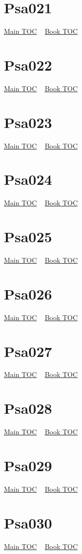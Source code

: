 \documentclass{book}
\begin{document}
  \section{Psa021}\hyperlink{toc}{Main TOC} ~ \hyperref[subsec:Psa]{Book TOC} 
  \section{Psa022}\hyperlink{toc}{Main TOC} ~ \hyperref[subsec:Psa]{Book TOC} 
  \section{Psa023}\hyperlink{toc}{Main TOC} ~ \hyperref[subsec:Psa]{Book TOC} 
  \section{Psa024}\hyperlink{toc}{Main TOC} ~ \hyperref[subsec:Psa]{Book TOC} 
  \section{Psa025}\hyperlink{toc}{Main TOC} ~ \hyperref[subsec:Psa]{Book TOC} 
  \section{Psa026}\hyperlink{toc}{Main TOC} ~ \hyperref[subsec:Psa]{Book TOC} 
  \section{Psa027}\hyperlink{toc}{Main TOC} ~ \hyperref[subsec:Psa]{Book TOC} 
  \section{Psa028}\hyperlink{toc}{Main TOC} ~ \hyperref[subsec:Psa]{Book TOC} 
  \section{Psa029}\hyperlink{toc}{Main TOC} ~ \hyperref[subsec:Psa]{Book TOC} 
  \section{Psa030}\hyperlink{toc}{Main TOC} ~ \hyperref[subsec:Psa]{Book TOC} 
\end{document}

